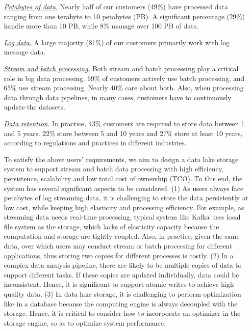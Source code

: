 \noindent \underline{\textit{Petabytes of data.}} Nearly half of our customers (49\%) have processed data ranging from one terabyte to 10 petabytes (PB). A significant percentage (29\%) handle more than 10 PB, while 8\% manage over 100 PB of data.


\noindent \underline{\textit{Log data.}} A large majority (81\%) of our customers primarily work with log message data.

\noindent \underline{\textit{Stream and batch processing.}} Both stream and batch processing play a critical role in big data processing. 69\% of  customers actively use batch processing, and 65\% use stream processing. Nearly 40\%  care about both. 
Also, when processing data through data pipelines, in many cases, customers  have to continuously  update the datasets.

\noindent \underline{\textit{Data retention.}} In practice, 43\% customers are required to store data between 1 and 5 years. 22\% store between 5 and 10 years and 27\% store at least 10 years, according to regulations and practices in different industries.


To satisfy the above users' requirements, we aim to design a data lake storage system to support stream and batch data processing with high efficiency, persistence, scalability and low total cost of ownership (TCO). To this end, the system has several significant aspects  to be considered. (1) As users always face petabytes of log streaming data, it is challenging to store the data persistently at low cost, while keeping high elasticity and processing efficiency. For example, as streaming data needs real-time processing,  typical system like Kafka uses local file system as the storage, which lacks of elasticity capacity because the computation and storage are tightly coupled. Also, in practice, given the same data, over which users may conduct stream or batch processing for different applications, thus storing two copies for different processes is costly.
(2) In a complex data analysis pipeline, there are likely to be multiple copies of data to support different tasks.
If these copies are updated individually, data  could be inconsistent.    Hence, it is significant to support atomic writes to achieve high quality data.
(3) In data lake storage,  it is challenging to perform  optimization like in a database because the computing engine is always decoupled with the storage. Hence, it is critical to consider how to incorporate an optimizer in the storage engine, so as to optimize system performance.

